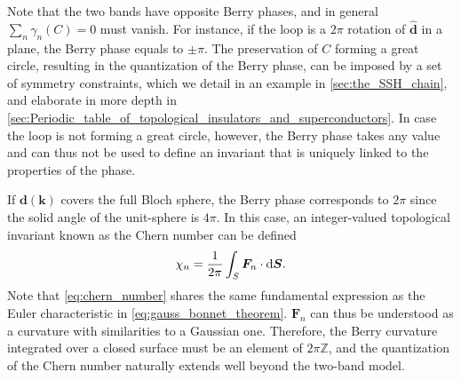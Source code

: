 Note that the two bands have opposite Berry phases, and in general $\sum_n\gamma_n(C)=0$ must vanish.
For instance, if the loop is a $2\pi$ rotation of $\hat{\bm d}$ in a plane, the Berry phase equals to $\pm\pi$.
The preservation of $C$ forming a great circle, resulting in the quantization of the Berry phase, can be imposed by a set of symmetry constraints, which we detail in an example in \cref{sec:the_SSH_chain}, and elaborate in more depth in \cref{sec:Periodic_table_of_topological_insulators_and_superconductors}.
In case the loop is not forming a great circle, however, the Berry phase takes any value and can thus not be used to define an invariant that is uniquely linked to the properties of the phase.

If $\bm d(\bm k)$ covers the full Bloch sphere, the Berry phase corresponds to $2\pi$ since the solid angle of the unit-sphere is $4\pi$.
In this case, an integer-valued topological invariant known as the Chern number can be defined~\cite{Nakahara1990}
\begin{align}
    \chi_n = \frac1{2\pi}\int_S {\bm F_n}\cdot\mathrm d{\bm S}.
    \label{eq:chern_number}
\end{align}
Note that \cref{eq:chern_number} shares the same fundamental expression as the Euler characteristic in \cref{eq:gauss_bonnet_theorem}.
$\bm F_n$ can thus be understood as a curvature with similarities to a Gaussian one.
Therefore, the Berry curvature integrated over a closed surface must be an element of $2\pi \mathds Z$, and the quantization of the Chern number naturally extends well beyond the two-band model.

%
%
